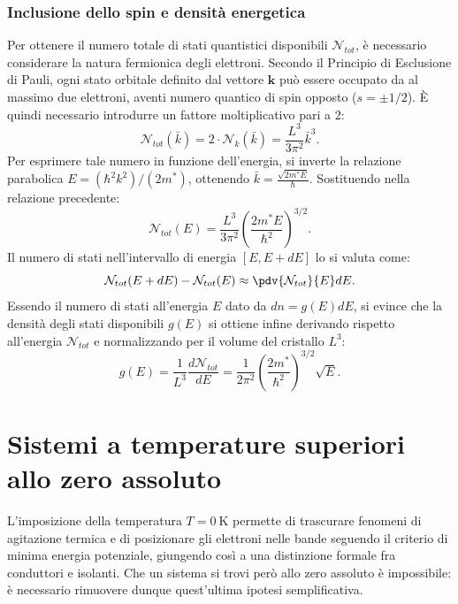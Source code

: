 \documentclass[a4paper,11pt]{report}
\begin{document}
\subsubsection{Inclusione dello spin e densità energetica}
Per ottenere il numero totale di stati quantistici disponibili $\mathcal{N}_{tot}$, è necessario considerare la natura fermionica degli elettroni. Secondo il Principio di Esclusione di Pauli, ogni stato orbitale definito dal vettore $\bm{k}$ può essere occupato da al massimo due elettroni, aventi numero quantico di spin opposto ($s = \pm 1/2$).
È quindi necessario introdurre un fattore moltiplicativo pari a 2:
\begin{equation}
    \mathcal{N}_{tot}(\bar{k}) = 2 \cdot \mathcal{N}_{k}(\bar{k}) = \frac{L^3}{3\pi^2} \bar{k}^3.
\end{equation}
Per esprimere tale numero in funzione dell'energia, si inverte la relazione parabolica $E = (\hbar^2 k^2)/(2m^*)$, ottenendo $\bar{k} = \frac{\sqrt{2m^* E}}{\hbar}$. Sostituendo nella relazione precedente:
\begin{equation}
    \mathcal{N}_{tot}(E) = \frac{L^3}{3\pi^2} \left( \frac{2m^* E}{\hbar^2} \right)^{3/2}.
\end{equation}
Il numero di stati nell'intervallo di energia $[E, E+dE]$ lo si valuta come:
\begin{equation}
    \mathcal{N}_{tot}(E+dE) - \mathcal{N}_{tot}(E) \approx \pdv{\mathcal{N}_{tot}}{E}dE.
\end{equation}
Essendo il numero di stati all'energia $E$ dato da $dn = g(E)dE$, si evince che la densità degli stati disponibili $g(E)$ si ottiene infine derivando rispetto all'energia $\mathcal{N}_{tot}$ e normalizzando per il volume del cristallo $L^3$:
\begin{equation}
    g(E) = \frac{1}{L^3} \frac{d \mathcal{N}_{tot}}{dE} = \frac{1}{2\pi^2} \left( \frac{2m^*}{\hbar^2} \right)^{3/2} \sqrt{E}.
\end{equation}

\section{Sistemi a temperature superiori allo zero assoluto}
L'imposizione della temperatura $T = \SI{0}{\kelvin}$ permette di trascurare fenomeni di agitazione termica e di posizionare gli elettroni nelle bande seguendo il criterio di minima energia potenziale, giungendo così a una distinzione formale fra conduttori e isolanti. Che un sistema si trovi però allo zero assoluto è impossibile: è necessario rimuovere dunque quest'ultima ipotesi semplificativa. 
\end{document}
